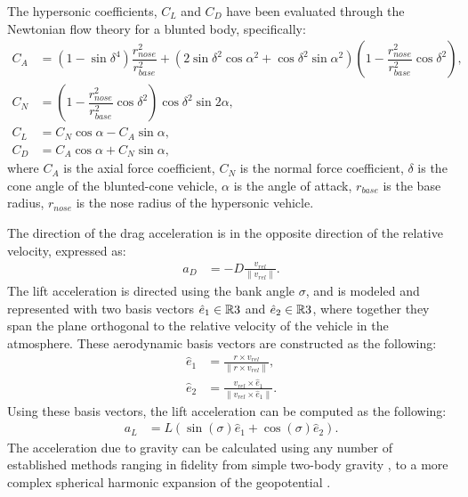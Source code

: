 The hypersonic coefficients, $C_L$ and $C_D$ have been evaluated through the Newtonian flow theory for a blunted body, specifically: 
\begin{align}
    C_A &= (1-\sin{\delta}^4)  \dfrac{r_{nose}^2}{r_{base}^2} + (2\sin{\delta}^2 \cos{\alpha}^2 + \cos{\delta}^2 \sin{\alpha}^2)\left(1-\dfrac{r_{nose}^2}{r_{base}^2} \cos{\delta}^2\right),\\
    C_N &= \left(1-\dfrac{r_{nose}^2}{r_{base}^2} \cos{\delta}^2\right)\cos{\delta}^2\sin{2\alpha},\\
    C_L &= C_N\cos{\alpha}-C_A\sin{\alpha},\\
    C_D &= C_A\cos{\alpha}+C_N\sin{\alpha},
\end{align}
where $C_A$ is the axial force coefficient, $C_N$ is the normal force coefficient, $\delta$ is the cone angle of the blunted-cone vehicle,  $\alpha$ is the angle of attack, $r_{base}$ is the base radius, $r_{nose}$ is the nose radius of the hypersonic vehicle.
        
The direction of the drag acceleration is in the opposite direction of the relative velocity, expressed as:
\begin{align}
    a_D &= -D \frac{v_{rel}}{\|v_{rel}\|}.
\end{align}
The lift acceleration is directed using the bank angle $\sigma$, and is modeled and represented with two basis vectors $\hat{e}_1 \in \mathbb{R}{3}$ and $\hat{e}_2 \in \mathbb{R}{3}$, where together they span the plane orthogonal to the relative velocity of the vehicle in the atmosphere. These aerodynamic basis vectors are constructed as the following:
\begin{align}
    \hat{e}_1 &=  \frac{r \times v_{rel}}{\|r \times v_{rel}\|}, \\ 
    \hat{e}_2 &= \frac{v_{rel} \times \hat{e}_1}{\| v_{rel} \times \hat{e}_1 \|} .
\end{align}
Using these basis vectors, the lift acceleration can be computed as the following:
\begin{align}
    a_L &= L(\sin(\sigma) \hat{e}_1 + \cos(\sigma)\hat{e}_2).
\end{align}
The acceleration due to gravity can be calculated using any number of established methods ranging in fidelity from simple two-body gravity \cite{montenbruck2002}, to a more complex spherical harmonic expansion of the geopotential \cite{hirt2012,genova2016}. 

